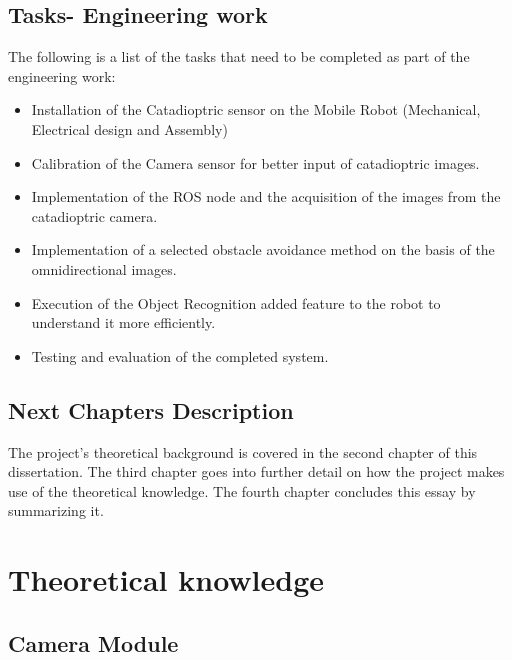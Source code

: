 \documentclass[11pt, a4paper, openany]{book}
\begin{document}
\section{Tasks- Engineering work}
The following is a list of the tasks that need to be completed as part of the engineering work:
\begin{itemize}
    \item Installation of the Catadioptric sensor on the Mobile Robot (Mechanical, Electrical design and Assembly)
    \item Calibration of the Camera sensor for better input of catadioptric images.
    \item Implementation of the ROS node and the acquisition of the images from the catadioptric camera.
    \item Implementation of a selected obstacle avoidance method on the basis of the omnidirectional images.
    \item Execution of the Object Recognition added feature to the robot to understand it more efficiently.
    \item Testing and evaluation of the completed system.
\end{itemize}

\section{Next Chapters Description}
The project's theoretical background is covered in the second chapter of this dissertation. The third chapter goes into further detail on how the project makes use of the theoretical knowledge. The fourth chapter concludes this essay by summarizing it.
\chapter{Theoretical knowledge}
\section{Camera Module}
\end{document}

